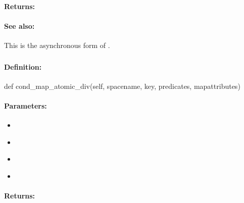 \paragraph{Returns:}


\paragraph{See also:}  This is the asynchronous form of .

\pagebreak
\subsubsection{}
\label{api:python:cond_map_atomic_div}


\paragraph{Definition:}
\begin{pythoncode}
def cond_map_atomic_div(self, spacename, key, predicates, mapattributes)
\end{pythoncode}

\paragraph{Parameters:}
\begin{itemize}[noitemsep]
\item {}\\

\item {}\\

\item {}\\

\item {}\\

\end{itemize}

\paragraph{Returns:}


